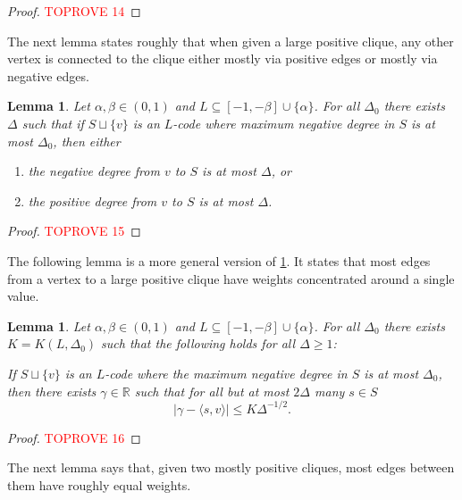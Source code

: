 \documentclass[reqno, 11pt]{amsart}
\newtheorem{lemma}[theorem]{Lemma}
\theoremstyle{definition}
\theoremstyle{remark}
\newcommand{\RR}{\mathbb{R}}
\begin{document}
\begin{proof}\textcolor{red}{TOPROVE 14}\end{proof}


The next lemma states roughly that when given a large positive clique, any other vertex is connected to the clique either mostly via positive edges or mostly via negative edges.

\begin{lemma}\label{lem:positive-clique}
Let $\alpha, \beta \in (0,1)$ and $L \subseteq [-1,-\beta]\cup\{\alpha\}$. For all $\Delta_0$ there exists $\Delta$ such that if $S\sqcup\{v\}$ is an $L$-code where maximum negative degree in $S$ is at most $\Delta_0$, then either
\begin{enumerate}
    \item[(a)] the negative degree from $v$ to $S$ is at  most $\Delta$, or
    \item[(b)]  the positive degree from $v$ to $S$ is at  most $\Delta$.
\end{enumerate}
\end{lemma}

\begin{proof}\textcolor{red}{TOPROVE 15}\end{proof}

The following lemma is a more general version of \cref{lem:positive-clique}. It states that most edges from a vertex to a large positive clique have weights concentrated around a single value.

\begin{lemma}\label{lem:edges-to-positive-clique}
Let $ \alpha, \beta \in (0,1)$ and $L \subseteq [-1,-\beta]\cup\{\alpha\}$. For all $\Delta_0$ there exists $K = K(L, \Delta_0)$ such that the following holds for all $\Delta \geq 1$:

If $S\sqcup\{v\}$ is an $L$-code where the maximum negative degree in $S$ is at most $\Delta_0$, then there exists $\gamma \in \RR$ such that for all but at most $2\Delta$ many $s \in S$
\[
	|\gamma - \langle s, v \rangle| \leq K \Delta^{-1/2}.
\]
\end{lemma}

\begin{proof}\textcolor{red}{TOPROVE 16}\end{proof}


The next lemma says that, given two mostly positive cliques, most edges between them have roughly equal weights.
\end{document}
